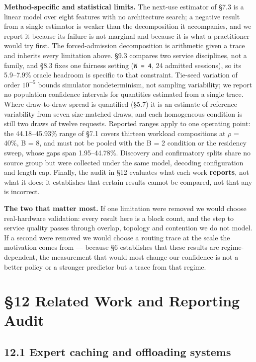 \documentclass[
  10pt,
  letterpaper,
  10pt]{article}
\begin{document}
\textbf{Method-specific and statistical limits.} The next-use estimator
of §7.3 is a linear model over eight features with no architecture
search; a negative result from a single estimator is weaker than the
decomposition it accompanies, and we report it because its failure is
not marginal and because it is what a practitioner would try first. The
forced-admission decomposition is arithmetic given a trace and inherits
every limitation above. §9.3 compares two service disciplines, not a
family, and §8.3 fixes one fairness setting (\texttt{W\ =\ 4}, 24
admitted sessions), so its 5.9--7.9\% oracle headroom is specific to
that constraint. Tie-seed variation of order \(10^{-5}\) bounds
simulator nondeterminism, not sampling variability; we report no
population confidence intervals for quantities estimated from a single
trace. Where draw-to-draw spread is quantified (§5.7) it is an estimate
of reference variability from seven size-matched draws, and each
homogeneous condition is still two draws of twelve requests. Reported
ranges apply to one operating point: the 44.18--45.93\% range of §7.1
covers thirteen workload compositions at \ensuremath{\rho} = 40\%, B =
8, and must not be pooled with the B = 2 condition or the residency
sweep, whose gaps span 1.95--44.78\%. Discovery and confirmatory splits
share no source group but were collected under the same model, decoding
configuration and length cap. Finally, the audit in §12 evaluates what
each work \textbf{reports}, not what it does; it establishes that
certain results cannot be compared, not that any is incorrect.

\textbf{The two that matter most.} If one limitation were removed we
would choose real-hardware validation: every result here is a block
count, and the step to service quality passes through overlap, topology
and contention we do not model. If a second were removed we would choose
a routing trace at the scale the motivation comes from --- because §6
establishes that these results are regime-dependent, the measurement
that would most change our confidence is not a better policy or a
stronger predictor but a trace from that regime.

\section{§12 Related Work and Reporting
Audit}\label{related-work-and-reporting-audit}

\subsection{12.1 Expert caching and offloading
systems}\label{expert-caching-and-offloading-systems}
\end{document}
